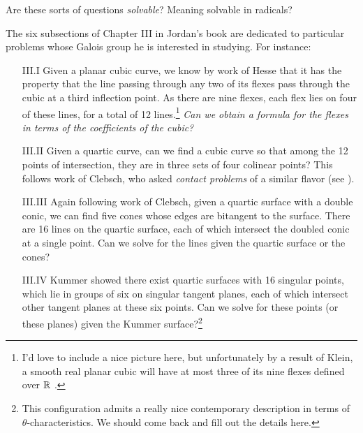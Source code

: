 \documentclass[11pt]{amsart}
\begin{document}
\begin{question} Are these sorts of questions \textit{solvable}? Meaning solvable in radicals?
\end{question}


The six subsections of Chapter III in Jordan's book are dedicated to particular problems whose Galois group he is interested in studying. For instance:
\begin{itemize}
    \item[III.I] Given a planar cubic curve, we know by work of Hesse that it has the property that the line passing through any two of its flexes pass through the cubic at a third inflection point. As there are nine flexes, each flex lies on four of these lines, for a total of 12 lines.\footnote{I'd love to include a nice picture here, but unfortunately by a result of Klein, a smooth real planar cubic will have at most three of its nine flexes defined over $\mathbb{R}$ \cite{Ronga-Klein}.} \emph{Can we obtain a formula for the flexes in terms of the coefficients of the cubic?}

    \item[III.II] Given a quartic curve, can we find a cubic curve so that among the 12 points of intersection, they are in three sets of four colinear points? This follows work of Clebsch, who asked \textit{contact problems} of a similar flavor (see \cite[(429)]{Jordan}).

    \item[III.III] Again following work of Clebsch, given a quartic surface with a double conic, we can find five cones whose edges are bitangent to the surface. There are 16 lines on the quartic surface, each of which intersect the doubled conic at a single point. Can we solve for the lines given the quartic surface or the cones?
    
    \item[III.IV] Kummer showed there exist quartic surfaces with 16 singular points, which lie in groups of six on singular tangent planes, each of which intersect other tangent planes at these six points. Can we solve for these points (or these planes) given the Kummer surface?\footnote{This configuration admits a really nice contemporary description in terms of $\theta$-characteristics. We should come back and fill out the details here.}


\end{itemize}
\end{document}
